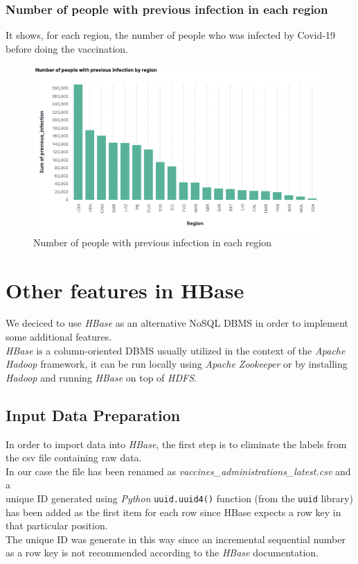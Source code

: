 \documentclass[12pt, a4paper]{article}
\begin{document}
\subsubsection{Number of people with previous infection in each region}
It shows, for each region, the number of people who was infected by Covid-19 before doing the vaccination.
\begin{figure}[H]
  \centering
  \includegraphics[width=.9\linewidth]{img (16).png}
\caption*{Number of people with previous infection in each region}
\end{figure}


\clearpage

\section{Other features in HBase} 

We deciced to use \emph{HBase} as an alternative NoSQL DBMS in order to implement some 
additional features. \\
\emph{HBase} is a column-oriented DBMS usually utilized in the context of the 
\emph{Apache Hadoop} framework, it can be run locally using \emph{Apache Zookeeper} or 
by installing \emph{Hadoop} and running \emph{HBase} on top of \emph{HDFS}.

\subsection{Input Data Preparation}

In order to import data into \emph{HBase}, the first step is to eliminate the labels 
from the csv file containing raw data. \\
In our case the file has been renamed as \emph{vaccines\_administrations\_latest.csv} 
and a \\ unique ID generated using \emph{Python} \texttt{uuid.uuid4()} function 
(from the \texttt{uuid} library) has been added as the first item for each row since
HBase expects a row key in that particular position. \\ 
The unique ID was generate in this way since an incremental sequential number as a 
row key is not recommended according to the \emph{HBase} documentation. 
\end{document}
